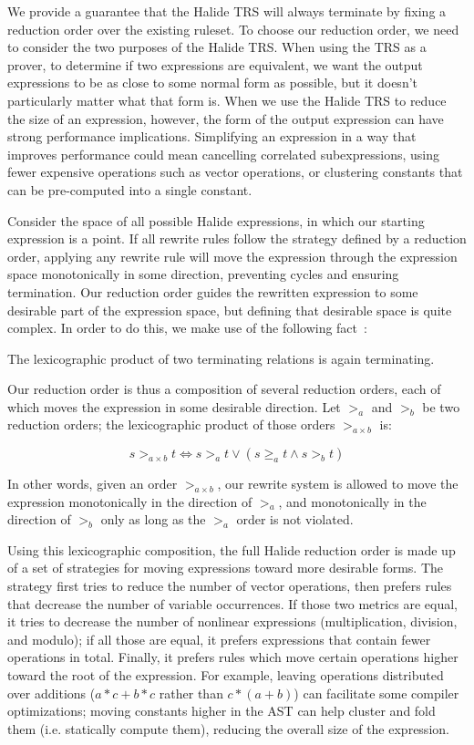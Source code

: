 \documentclass[sigplan,10pt,review,anonymous]{acmart}\settopmatter{printfolios=true,printccs=false,printacmref=false}
\begin{document}
We provide a guarantee that the Halide TRS will always terminate by fixing a
reduction order over the existing ruleset. To choose our reduction order, we
need to consider the two purposes of the Halide TRS. When using the TRS
as a prover, to determine if two expressions are equivalent, we want
the output expressions to be as close to some normal form as possible, but it
doesn't particularly matter what that form is. When we use the Halide TRS
to reduce the size of an expression, however, the form of the output expression
can have strong performance implications.
Simplifying an expression in a way that
improves performance could mean cancelling correlated subexpressions, using
fewer expensive operations such as vector operations, or clustering constants
that can be pre-computed into a single constant.

Consider the space of all possible Halide expressions, in which our starting
expression is a point. If all rewrite rules follow the strategy defined by a reduction order, applying any
rewrite rule will move the expression through the expression space monotonically
in some direction, preventing cycles and ensuring termination. Our reduction
order guides the rewritten expression to some desirable part of the
expression space, but defining that desirable space is quite complex. In order
to do this, we make use of the following fact~\cite{baader1999term}:

\begin{theorem}
The lexicographic product of two terminating relations is again terminating.
\end{theorem}

Our reduction order is thus a composition of several reduction orders, each of
which moves the expression in some desirable direction. Let $>_a$ and $>_b$ be
two reduction orders; the lexicographic product of those orders $>_{a \times b}$
is:

\[
s >_{a \times b} t \iff s >_a t \vee (s \geq_a t \wedge s >_b t)
\] 

In other words, given an order $>_{a \times b}$, our rewrite system is allowed
to move the expression monotonically in the direction of $>_a$, and
monotonically in the direction of $>_b$ only as long as the $>_a$ order is not
violated.

Using this lexicographic composition, the full Halide reduction order is made up of a set of strategies for moving expressions toward more desirable forms. The strategy first tries to reduce the number of vector operations, then prefers rules that decrease the number of variable occurrences. If those two metrics are equal, it tries to decrease the number of nonlinear expressions (multiplication, division, and modulo); if all those are equal, it prefers expressions that contain fewer operations in total. Finally, it prefers rules which move certain operations higher toward the root of the expression. For example,
leaving operations distributed over additions ($a*c + b*c$ rather than
$c*(a +b)$) can facilitate some compiler optimizations; moving constants higher in the
AST can help cluster and fold them (i.e. statically compute them), reducing the overall size of the expression.
\end{document}
